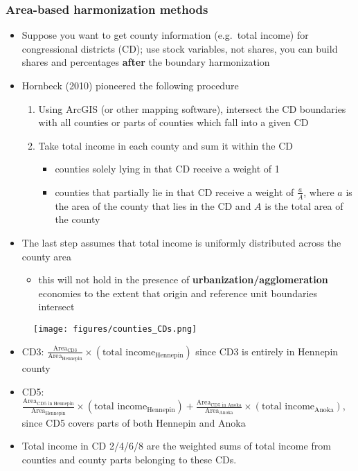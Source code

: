 \documentclass{beamer}
\begin{document}
\begin{frame}
\frametitle{Area-based harmonization methods}
\begin{itemize}
    \item Suppose you want to get county information (e.g.\ total income) for congressional districts (CD); use stock variables, not shares, you can build shares and percentages \textbf{after} the boundary harmonization
    \pause
    \item Hornbeck (2010) pioneered the following procedure
    \begin{enumerate}
        \item Using ArcGIS (or other mapping software), intersect the CD boundaries with all counties or parts of counties which fall into a given CD
        \item Take total income in each county and sum it within the CD
        \begin{itemize}
            \item counties solely lying in that CD receive a weight of 1
            \item counties that partially lie in that CD receive a weight of $\frac{a}{A}$, where $a$ is the area of the county that lies in the CD and $A$ is the total area of the county
        \end{itemize}
    \end{enumerate}
    \pause
    \item The last step assumes that total income is uniformly distributed across the county area
    \begin{itemize}
        \item this will not hold in the presence of \textbf{urbanization/agglomeration} economies to the extent that origin and reference unit boundaries intersect
    \end{itemize}
\end{itemize}

\end{frame}


\begin{frame}
\begin{figure}
    \centering
    \texttt{[image: figures/counties\_CDs.png]}
\end{figure}
\begin{itemize}
    \item CD3: $\frac{\text{Area}_{\text{CD3}}}{\text{Area}_{\text{Hennepin}}}\times (\text{total income}_{\text{Hennepin}})$ since CD3 is entirely in Hennepin county \pause
    \item CD5: $\frac{\text{Area}_{\text{CD5 in Hennepin}}}{\text{Area}_{\text{Hennepin}}}\times (\text{total income}_{\text{Hennepin}}) + \frac{\text{Area}_{\text{CD5 in Anoka}}}{\text{Area}_{\text{Anoka}}}\times (\text{total income}_{\text{Anoka}})$, since CD5 covers parts of both Hennepin and Anoka \pause
    \item Total income in CD 2/4/6/8 are the weighted sums of total income from counties and county parts belonging to these CDs.
\end{itemize}

\end{frame}
\end{document}
